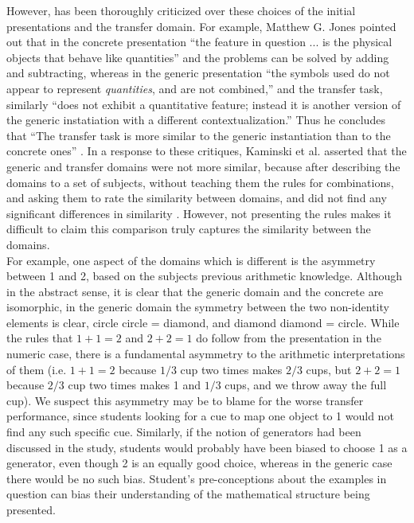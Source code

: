 \documentclass[11pt]{article}
\begin{document}
However, \cite{Kaminski2008} has been thoroughly criticized over these choices of the initial presentations and the transfer domain. For example, Matthew G. Jones pointed out that in the concrete presentation ``the feature in question ... is the physical objects that behave like quantities'' and the problems can be solved by adding and subtracting, whereas in the generic presentation ``the symbols used do not appear to represent \emph{quantities}, and are not combined,'' and the transfer task, similarly ``does not exhibit a quantitative feature; instead it is another version of the generic instatiation with a different contextualization.'' Thus he concludes that ``The transfer task is more similar to the generic instantiation than to the concrete ones'' \cite{Jones2009}. In a response to these critiques, Kaminski et al. asserted that the generic and transfer domains were not more similar, because after describing the domains to a set of subjects, without teaching them the rules for combinations, and asking them to rate the similarity between domains, and did not find any significant differences in similarity \cite{Kaminski2009}. However, not presenting the rules makes it difficult to claim this comparison truly captures the similarity between the domains. \\[11pt]
For example, one aspect of the domains which is different is the asymmetry between 1 and 2, based on the subjects previous arithmetic knowledge. Although in the abstract sense, it is clear that the generic domain and the concrete are isomorphic, in the generic domain the symmetry between the two non-identity elements is clear, circle circle = diamond, and diamond diamond = circle. While the rules that $1+1=2$ and $2+2=1$ do follow from the presentation in the numeric case, there is a fundamental asymmetry to the arithmetic interpretations of them (i.e. $1+1 = 2$ because $1/3$ cup two times makes $2/3$ cups, but $2+2 = 1$ because $2/3$ cup two times makes 1 and $1/3$ cups, and we throw away the full cup). We suspect this asymmetry may be to blame for the worse transfer performance, since students looking for a cue to map one object to 1 would not find any such specific cue. Similarly, if the notion of generators had been discussed in the study, students would probably have been biased to choose 1 as a generator, even though 2 is an equally good choice, whereas in the generic case there would be no such bias. Student's pre-conceptions about the examples in question can bias their understanding of the mathematical structure being presented. \\[11pt]
\end{document}
